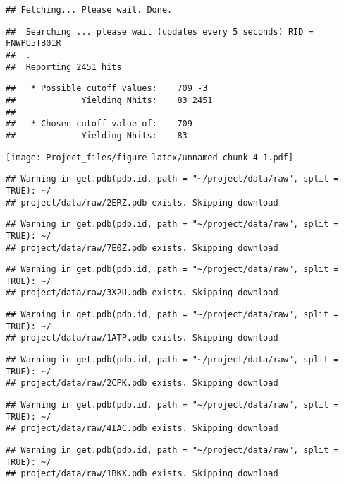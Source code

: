 \documentclass[
]{article}
\begin{document}
\begin{verbatim}
## Fetching... Please wait. Done.
\end{verbatim}

\begin{verbatim}
##  Searching ... please wait (updates every 5 seconds) RID = FNWPU5TB01R 
##  .
##  Reporting 2451 hits
\end{verbatim}

\begin{verbatim}
##   * Possible cutoff values:    709 -3 
##             Yielding Nhits:    83 2451 
## 
##   * Chosen cutoff value of:    709 
##             Yielding Nhits:    83
\end{verbatim}

\texttt{[image: Project\_files/figure-latex/unnamed-chunk-4-1.pdf]}

\begin{verbatim}
## Warning in get.pdb(pdb.id, path = "~/project/data/raw", split = TRUE): ~/
## project/data/raw/2ERZ.pdb exists. Skipping download
\end{verbatim}

\begin{verbatim}
## Warning in get.pdb(pdb.id, path = "~/project/data/raw", split = TRUE): ~/
## project/data/raw/7E0Z.pdb exists. Skipping download
\end{verbatim}

\begin{verbatim}
## Warning in get.pdb(pdb.id, path = "~/project/data/raw", split = TRUE): ~/
## project/data/raw/3X2U.pdb exists. Skipping download
\end{verbatim}

\begin{verbatim}
## Warning in get.pdb(pdb.id, path = "~/project/data/raw", split = TRUE): ~/
## project/data/raw/1ATP.pdb exists. Skipping download
\end{verbatim}

\begin{verbatim}
## Warning in get.pdb(pdb.id, path = "~/project/data/raw", split = TRUE): ~/
## project/data/raw/2CPK.pdb exists. Skipping download
\end{verbatim}

\begin{verbatim}
## Warning in get.pdb(pdb.id, path = "~/project/data/raw", split = TRUE): ~/
## project/data/raw/4IAC.pdb exists. Skipping download
\end{verbatim}

\begin{verbatim}
## Warning in get.pdb(pdb.id, path = "~/project/data/raw", split = TRUE): ~/
## project/data/raw/1BKX.pdb exists. Skipping download
\end{verbatim}
\end{document}

